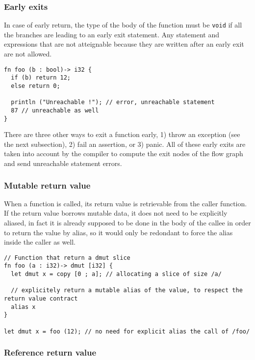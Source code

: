 \subsubsection {Early exits}

In case of early return, the type of the body of the function must be
\texttt{void} if all the branches are leading to an early exit statement. Any
statement and expressions that are not atteignable because they are written
after an early exit are not allowed.

\begin{lstlisting}[style=coloredverbatim]
fn foo (b : bool)-> i32 {
  if (b) return 12;
  else return 0;

  println ("Unreachable !"); // error, unreachable statement
  87 // unreachable as well
}
\end{lstlisting}

There are three other ways to exit a function early, 1) throw an exception (see
the next subsection), 2) fail an assertion, or 3) panic. All of these early
exits are taken into account by the compiler to compute the exit nodes of the
flow graph and send unreachable statement errors.

\subsubsection{Mutable return value}

When a function is called, its return value is retrievable from the caller
function. If the return value borrows mutable data, it does not need to be
explicitly aliased, in fact it is already supposed to be done in the body of the
callee in order to return the value by alias, so it would only be redondant to
force the alias inside the caller as well.

\begin{lstlisting}[style=coloredverbatim]
// Function that return a dmut slice
fn foo (a : i32)-> dmut [i32] {
  let dmut x = copy [0 ; a]; // allocating a slice of size /a/

  // explicitely return a mutable alias of the value, to respect the return value contract
  alias x
}

let dmut x = foo (12); // no need for explicit alias the call of /foo/
\end{lstlisting}

\subsubsection {Reference return value}

